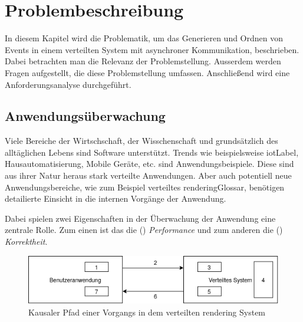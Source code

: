 %

\chapter{Problembeschreibung}
\label{chapter:Problembeschreibung}
In diesem Kapitel wird die Problematik, um das Generieren und Ordnen von Events in einem verteilten System mit asynchroner Kommunikation, beschrieben. Dabei betrachten man die Relevanz der Problemstellung. Ausserdem werden Fragen aufgestellt, die diese Problemstellung umfassen. Anschließend wird eine Anforderungsanalyse durchgeführt.

\section{Anwendungsüberwachung}
\label{section:Tracing von Anwendungen}
Viele Bereiche der Wirtschschaft, der Wisschenschaft und grundsätzlich des alltäglichen Lebens sind Software unterstützt. Trends wie beispielsweise \gls{iotLabel}, Hausautomatisierung, Mobile Geräte, etc. sind Anwendungsbeispiele. Diese sind aus ihrer Natur heraus stark verteilte Anwendungen. Aber auch potentiell neue Anwendungsbereiche, wie zum Beispiel verteiltes \gls{renderingGlossar}, benötigen detailierte Einsicht in die internen Vorgänge der Anwendung. 

Dabei spielen zwei Eigenschaften in der Überwachung der Anwendung eine zentrale Rolle. 
Zum einen ist das die () \emph{Performance} und zum anderen die () \emph{Korrektheit}.

\begin{figure}[!ht]
	\centering
	\includegraphics[scale=0.5]{img/Problembeschreibung/Anwendungsueberwachung_Gesamtsystem.png}
	\caption[Kausaler Pfad einer Vorgangs in dem verteilten rendering System]{Kausaler Pfad einer Vorgangs in dem verteilten rendering System}
	\label{fig:Anwendungsueberwachung_Gesamtsystem}
\end{figure}


